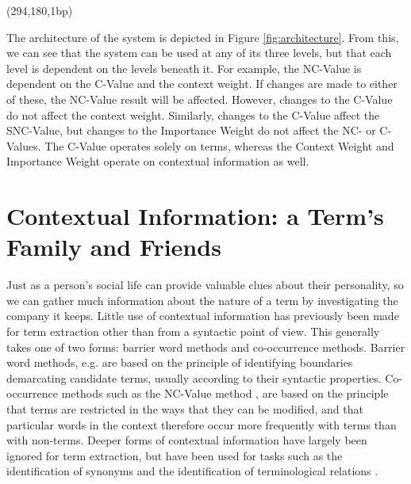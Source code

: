 \begin{figure*}[htbp]
\begin{center}
\begin{epsf}
\end{epsf}
\begin{draft}
\atari(294,180,1bp)
\end{draft}
\end{center}
\caption{Architecture of the TRUCKS Model}
\label{fig:architecture}
\end{figure*}

The architecture of the system is depicted in Figure
\ref{fig:architecture}. From this, we can see that the system can be used at any of its three levels, but that each level is dependent on
the levels beneath it. For example, the NC-Value is dependent on
the C-Value and the context weight. If changes are made to either of
these, the NC-Value result will be affected. However, changes to the
C-Value do not affect the context weight. Similarly, changes to the
C-Value affect the SNC-Value, but changes to the Importance Weight do not
affect the NC- or C-Values. The C-Value operates solely
on terms, whereas the Context Weight and Importance Weight operate on
contextual information as well. 


\section{Contextual Information: a Term's Family and Friends}
Just as a person's social life can provide valuable clues about their
personality, so we can gather much information about the nature of a
term by investigating the company it keeps. Little use of contextual
information has previously been made for term extraction other than from a
syntactic point of view. This generally takes one of two forms: barrier
word methods and co-occurrence methods. Barrier word methods,
e.g. \cite{Bourigault92,Nelson95} are based on the principle of identifying
boundaries demarcating candidate terms, usually according to their
syntactic properties. Co-occurrence methods such as the NC-Value
method \cite{Frantzi98}, are based on the principle that terms are
restricted in the ways that they can be modified, and that particular
words in the context therefore occur more frequently with terms than with
non-terms.  Deeper forms of contextual information have largely been
ignored for term extraction, but have been used for tasks such as the identification
of synonyms \cite{Grefenstette94} and the identification of
terminological relations \cite{Davidson98,Meyer99}.

